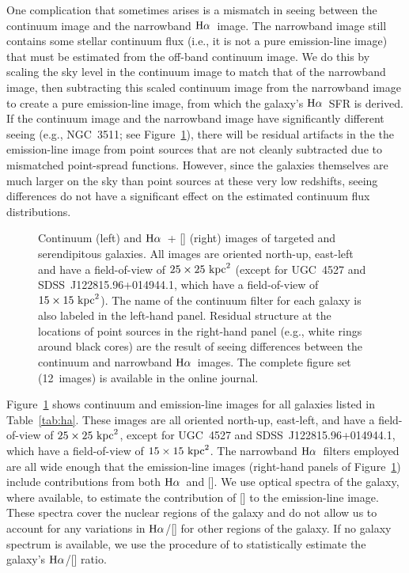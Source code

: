 \documentclass[twocolumn,twocolappendix,tighten,times]{aastex6}
\newcommand{\NII}{\ion{N}{2}}
\newcommand{\Ha}{\ensuremath{{\rm H}\alpha}}
\begin{document}
\clearpage



One complication that sometimes arises is a mismatch in seeing between the 
continuum image and the narrowband \Ha\ image. The narrowband image still 
contains some stellar continuum flux (i.e., it is not a pure emission-line image) 
that must be estimated from the off-band continuum image. We do this by scaling 
the sky level in the continuum image to match that of the narrowband image, then 
subtracting this scaled continuum image from the narrowband image to create a 
pure emission-line image, from which the galaxy's \Ha\ SFR is derived. If the 
continuum image and the narrowband image have significantly different seeing 
(e.g., NGC~3511; see Figure~\ref{fig:images}), there will be residual artifacts 
in the the emission-line image from point sources that are not cleanly subtracted 
due to mismatched point-spread functions. However, since the galaxies themselves 
are much larger on the sky than point sources at these very low redshifts, seeing 
differences do not have a significant effect on the estimated continuum flux 
distributions.


\begin{figure}[!t]
\caption{Continuum (left) and \Ha\ + [\NII] (right) images of targeted and serendipitous galaxies. All images are oriented north-up, east-left and have a field-of-view of $25\times25~{\rm kpc}^2$ (except for UGC~4527 and SDSS~J122815.96+014944.1, which have a field-of-view of $15\times15~{\rm kpc}^2$). The name of the continuum filter for each galaxy is also labeled in the left-hand panel. Residual structure at the locations of point sources in the right-hand panel (e.g., white rings around black cores) are the result of seeing differences between the continuum and narrowband \Ha\ images. The complete figure set (12~images) is available in the online journal.
\label{fig:images}}
\end{figure}


Figure~\ref{fig:images} shows continuum and emission-line images for all galaxies 
listed in Table~\ref{tab:ha}. These images are all oriented north-up, east-left, 
and have a field-of-view of $25\times25~{\rm kpc}^2$, except for UGC~4527 and 
SDSS~J122815.96+014944.1, which have a field-of-view of $15\times15~{\rm kpc}^2$. 
The narrowband \Ha\ filters employed are all wide enough that the emission-line 
images (right-hand panels of Figure~\ref{fig:images}) include contributions from 
both \Ha\ and [\NII]. We use optical spectra of the galaxy, where available, to 
estimate the contribution of [\NII] to the emission-line image. These spectra 
cover the nuclear regions of the galaxy and do not allow us to account for any 
variations in \Ha/[\NII] for other regions of the galaxy. If no galaxy spectrum is 
available, we use the procedure of \citet{kennicutt08} to statistically estimate 
the galaxy's \Ha/[\NII] ratio.
\end{document}
